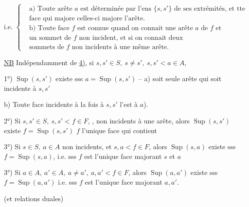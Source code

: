 
i.e. $\left\{\begin{aligned}
 &\text{a) Toute arête $a$ est déterminée par l'ens $\{s,s'\}$ de ses extrémités, et tte}\\
 &\text{face qui majore celles-ci majore l'arête.}\\
 &\text{b) Toute face $f$ est connue quand on connait une arête $a$ de $f$ et}\\
 &\text{un sommet de $f$ non incident, et si on connait deux}\\
 &\text{sommets de $f$ non incidents à une même arête.}
\end{aligned}\right.$

\uline{NB} Indépendamment de \uline{4)}, si $s,s'\in S,\ s\ne s',\ s,s'<a\in A$, 

1°) $\operatorname{Sup}(s,s')$ existe sss $a=\operatorname{Sup}(s,s')$ --  a)  soit seule arête qui soit incidente à $s,s'$

b) Toute face incidente à la fois à $s,s'$ l'est à $a$).


2°) Si $s,s'\in S,\ s,s'<f\in F$, , non incidents à une  arête, alors $\operatorname{Sup}(s,s')$ existe \deleted{$\Longleftrightarrow$} $f=\operatorname{Sup}(s,s')$ \deleted{$\Longleftrightarrow$} $f$ l'unique face qui contient 

3°) Si $s\in S,\ a\in A$ non incidents, et $s,a<f\in F$, alors $\operatorname{Sup}(s,a)$ existe sss $f=\operatorname{Sup}(s,a)$,  i.e. sss $f$ est l'unique face majorant $s$ et $a$

3°) Si $a\in A,\ a'\in A,\ a\ne a',\ a,a'<f\in F$, alors $\operatorname{Sup}(a,a')$ existe sss $f=\operatorname{Sup}(a,a')$ i.e. sss $f$ est l'unique face majorant $a,a'$.

(et relations duales)

\diagram{\begin{tikzcd}[ampersand replacement=\&,column sep=small]
{}\arrow[d,dash,bend right=36,start anchor=west,end anchor=west]\&{}\\
{}\arrow[r,Leftrightarrow]\&{}\arrow[u,dash,bend right=24]
\end{tikzcd}}

